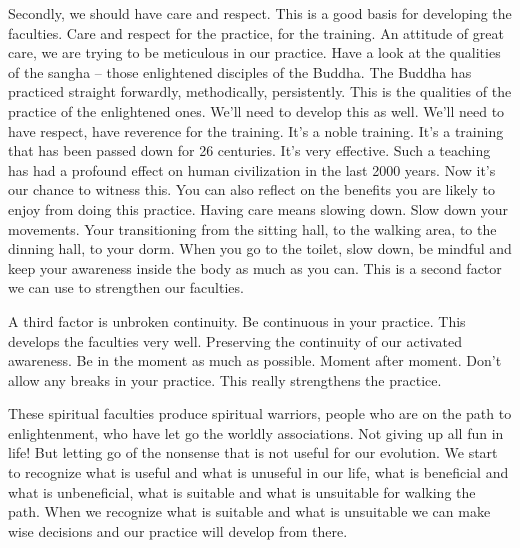 \documentclass[letterpaper,10pt,english]{sphinxmanual}
\begin{document}
\sphinxAtStartPar
Secondly,  we  should  have  care  and  respect. This  is  a  good  basis  for
developing the faculties. Care and respect for the practice, for the training.
An  attitude  of  great  care,  we  are  trying  to  be  meticulous  in  our  practice.
Have a look at the qualities of the sangha – those enlightened disciples of the
Buddha. The Buddha has practiced straight forwardly, methodically, persistently. This is the qualities of the practice of the enlightened ones. We’ll need
to develop this as well. We’ll need to have respect, have reverence for the
training. It’s a noble training. It’s a training that has been passed down for
26 centuries. It’s very effective. Such a teaching has had a profound effect
  on human civilization in the last 2000 years. Now it’s our chance to witness
this. You can also reflect on the benefits you are likely to enjoy from doing
this  practice.  Having  care  means  slowing  down.  Slow  down  your  movements. Your  transitioning  from  the  sitting  hall,  to  the  walking  area,  to  the
dinning hall, to your dorm. When you go to the toilet, slow down, be mindful and keep your awareness inside the body as much as you can. This is a
second factor we can use to strengthen our faculties.

\sphinxAtStartPar
A  third  factor  is  unbroken  continuity.  Be  continuous  in  your  practice. This develops the faculties very well. Preserving the continuity of our
activated awareness. Be in the moment as much as possible. Moment after
moment.  Don’t  allow  any  breaks  in  your  practice. This  really  strengthens
the practice.

\sphinxAtStartPar
These spiritual faculties produce spiritual warriors, people who are on
the  path  to  enlightenment,  who  have  let  go  the  worldly  associations.  Not
giving  up  all  fun  in  life!  But  letting  go  of  the  nonsense  that  is  not  useful
for our evolution. We start to recognize what is useful and what is unuseful
in our life, what is beneficial and what is unbeneficial, what is suitable and
what is unsuitable for walking the path. When we recognize what is suitable
and  what  is  unsuitable  we  can  make  wise  decisions  and  our  practice  will
develop from there.
\end{document}
